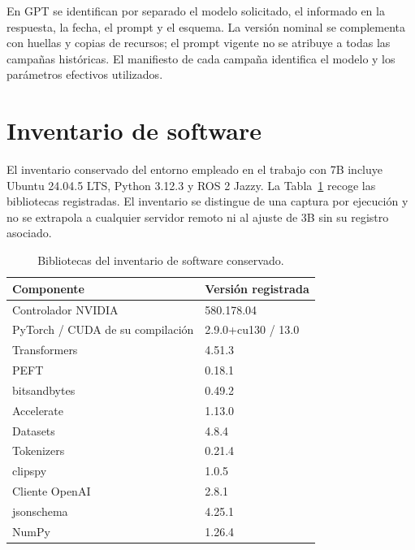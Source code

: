 En GPT se identifican por separado el modelo solicitado, el informado
en la respuesta, la fecha, el prompt y el esquema. La versión nominal
se complementa con huellas y copias de recursos; el prompt vigente no
se atribuye a todas las campañas históricas. El manifiesto de cada campaña identifica el modelo
y los parámetros efectivos utilizados.



\section{Inventario de software}

El inventario conservado del entorno empleado en el trabajo con 7B
incluye Ubuntu 24.04.5 LTS, Python 3.12.3 y ROS 2 Jazzy. La
Tabla~\ref{tab:entorno_registrado_impl} recoge las bibliotecas registradas.
El inventario se distingue de una captura por ejecución y no se extrapola
a cualquier servidor remoto ni al ajuste de 3B sin su registro asociado.

\begin{table}[htbp]
\centering
\small
\caption{Bibliotecas del inventario de software conservado.}
\label{tab:entorno_registrado_impl}
\begin{tabularx}{\textwidth}{@{}Xl@{}}
\toprule
\textbf{Componente} & \textbf{Versión registrada} \\
\midrule
Controlador NVIDIA & 580.178.04 \\
PyTorch / CUDA de su compilación & 2.9.0+cu130 / 13.0 \\
Transformers & 4.51.3 \\
PEFT & 0.18.1 \\
bitsandbytes & 0.49.2 \\
Accelerate & 1.13.0 \\
Datasets & 4.8.4 \\
Tokenizers & 0.21.4 \\
clipspy & 1.0.5 \\
Cliente OpenAI & 2.8.1 \\
jsonschema & 4.25.1 \\
NumPy & 1.26.4 \\
\bottomrule
\end{tabularx}
\end{table}

